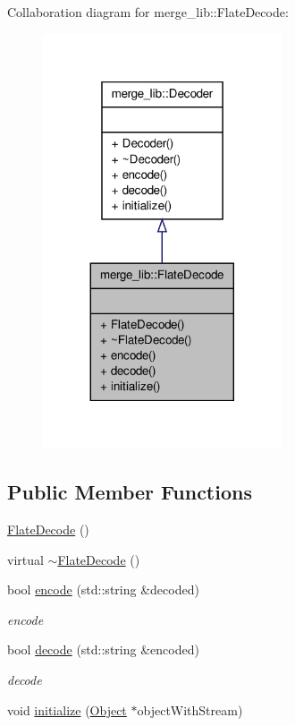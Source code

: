 Collaboration diagram for merge\-\_\-lib\-:\-:Flate\-Decode\-:
\nopagebreak
\begin{figure}[H]
\begin{center}
\leavevmode
\includegraphics[width=200pt]{d1/d3b/classmerge__lib_1_1_flate_decode__coll__graph}
\end{center}
\end{figure}
\subsection*{Public Member Functions}
\begin{DoxyCompactItemize}
\item 
\hyperlink{classmerge__lib_1_1_flate_decode_afc50d24376979061025b8cdc21bc9135}{Flate\-Decode} ()
\item 
virtual \hyperlink{classmerge__lib_1_1_flate_decode_a25ce9f4dc70abe0746f4ce4cb03e06dd}{$\sim$\-Flate\-Decode} ()
\item 
bool \hyperlink{classmerge__lib_1_1_flate_decode_aa0777e2be94bf83ed3e677bb1ac99133}{encode} (std\-::string \&decoded)
\begin{DoxyCompactList}\small\item\em encode \end{DoxyCompactList}\item 
bool \hyperlink{classmerge__lib_1_1_flate_decode_af5507b5d8b85879ac21c39abb54c3a13}{decode} (std\-::string \&encoded)
\begin{DoxyCompactList}\small\item\em decode \end{DoxyCompactList}\item 
void \hyperlink{classmerge__lib_1_1_flate_decode_ae0644a898654752cf5f8cd2d27d806ca}{initialize} (\hyperlink{classmerge__lib_1_1_object}{Object} $\ast$object\-With\-Stream)
\end{DoxyCompactItemize}


